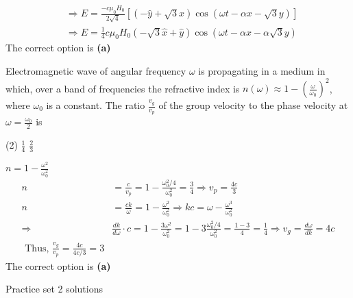 \begin{enumerate}
\begin{answer}
$$\begin{aligned}
	&\Rightarrow E=\frac{-c \mu_{0} H_{0}}{2 \sqrt{4}}[(-\hat{y}+\sqrt{3} \hat{x}) \cos (\omega t-\alpha x-\sqrt{3} y)] \\
	&\Rightarrow E=\frac{1}{4} c \mu_{0} H_{0}(-\sqrt{3} \hat{x}+\hat{y}) \cos (\omega t-\alpha x-\alpha \sqrt{3} y)
	\end{aligned}
	$$
	The correct option is \textbf{(a)}	
\end{answer}
\begin{minipage}{\textwidth}
	\item Electromagnetic wave of angular frequency $\omega$ is propagating in a medium in which, over a band of frequencies the refractive index is $n(\omega) \approx 1-\left(\frac{\omega}{\omega_{0}}\right)^{2}$, where $\omega_{0}$ is a constant. The ratio $\frac{v_{g}}{v_{p}}$ of the group velocity to the phase velocity at $\omega=\frac{\omega_{0}}{2}$ is
\end{minipage}
\begin{tasks}(2)
	\task[\textbf{B.}]$\frac{1}{4}$
	\task[\textbf{C.}]$\frac{2}{3}$
\end{tasks}
\begin{answer}
	$ n=1-\frac{\omega^{2}}{\omega_{0}^{2}}$ 
	$$ \begin{aligned}
	n &=\frac{c}{v_{p}}=1-\frac{\omega_{0}^{2} / 4}{\omega_{0}^{2}}=\frac{3}{4} \Rightarrow v_{p}=\frac{4 c}{3} \\
	n &=\frac{c k}{\omega}=1-\frac{\omega^{2}}{\omega_{0}^{2}} \Rightarrow k c=\omega-\frac{\omega^{3}}{\omega_{0}^{2}} \\
	\Rightarrow & \frac{d k}{d \omega} \cdot c=1-\frac{3 \omega^{2}}{\omega_{0}^{2}}=1-3 \frac{\omega_{0}^{2} / 4}{\omega_{0}^{2}}=\frac{1-3}{4}=\frac{1}{4} \Rightarrow v_{g}=\frac{d \omega}{d k}=4 c \\
	\text { Thus, } \frac{v_{g}}{v_{p}}=\frac{4 c}{4 c / 3}=3 &
	\end{aligned}$$
	The correct option is \textbf{(a)}	
\end{answer}	
\end{enumerate}
\newpage
\begin{abox}
	Practice set 2 solutions
	\end{abox}
